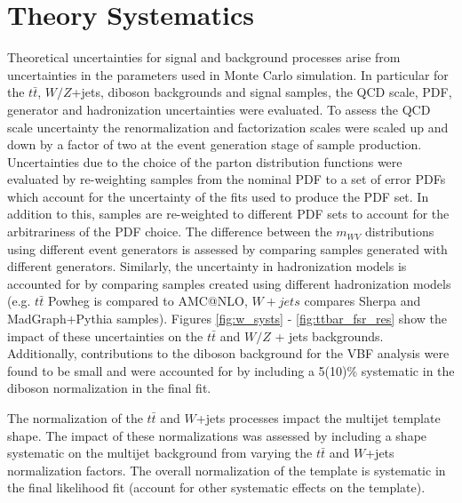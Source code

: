 \section{Theory Systematics}
Theoretical uncertainties for signal and background processes arise from uncertainties in the parameters used in Monte Carlo simulation. In particular for the $t\bar{t}$, $W/Z$+jets, diboson backgrounds and signal samples, the QCD scale, PDF, generator and hadronization uncertainties were evaluated. To assess the QCD scale uncertainty the renormalization and factorization scales were scaled up and down by a factor of two at the event generation stage of sample production. Uncertainties due to the choice of the parton distribution functions were evaluated by re-weighting samples from the nominal PDF to a set of error PDFs which account for the uncertainty of the fits used to produce the PDF set. In addition to this, samples are re-weighted to different PDF sets to account for the arbitrariness of the PDF choice. The difference between the $m_{WV}$ distributions using different event generators is assessed by comparing samples generated with different generators. Similarly, the uncertainty in hadronization models is accounted for by comparing samples created using different hadronization models (e.g. $t\bar{t}$ Powheg is compared to AMC@NLO, $W+jets$ compares Sherpa and MadGraph+Pythia samples). Figures \ref{fig:w_systs} - \ref{fig:ttbar_fsr_res} show the impact of these uncertainties on the $t\bar{t}$ and $W/Z$ + jets backgrounds. Additionally, contributions to the diboson background for the VBF analysis were found to be small and were accounted for by including a 5(10)\% systematic in the diboson normalization in the final fit.

The normalization of the $t\bar{t}$ and $W$+jets processes impact the multijet template shape. The impact of these normalizations was assessed by including a shape systematic on the multijet background from varying the $t\bar{t}$ and $W$+jets normalization factors. The overall normalization of the template is systematic in the final likelihood fit (account for other systematic effects on the template).



